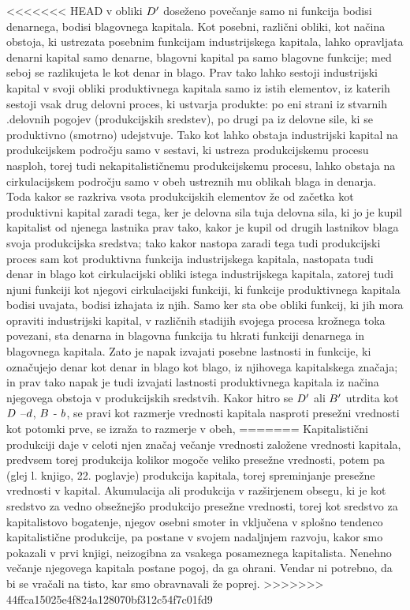 \documentclass[kapital_02.tex]{subfiles}
\begin{document}
<<<<<<< HEAD
 v obliki \( D' \) doseženo povečanje samo ni funkcija bodisi denarnega, bodisi blagovnega kapitala. Kot posebni, različni obliki, kot načina obstoja, ki ustrezata posebnim funkcijam industrijskega kapitala, lahko opravljata denarni kapital samo denarne, blagovni kapital pa samo blagovne funkcije; med seboj se razlikujeta le kot denar in blago. Prav tako lahko sestoji industrijski kapital v svoji obliki produktivnega kapitala samo iz istih elementov, iz katerih sestoji vsak drug delovni proces, ki ustvarja produkte: po eni strani iz stvarnih .delovnih pogojev (produkcijskih sredstev), po drugi pa iz delovne sile, ki se produktivno (smotrno) udejstvuje. Tako kot lahko obstaja industrijski kapital na produkcijskem področju samo v sestavi, ki ustreza produkcijskemu procesu nasploh, torej tudi nekapitalističnemu produkcijskemu procesu, lahko obstaja na cirkulacijskem področju samo v obeh ustreznih mu oblikah blaga in denarja. Toda kakor se razkriva vsota produkcijskih elementov že od začetka kot produktivni kapital zaradi tega, ker je delovna sila tuja delovna sila, ki jo je kupil kapitalist od njenega lastnika prav tako, kakor je kupil od drugih lastnikov blaga svoja produkcijska sredstva; tako kakor nastopa zaradi tega tudi produkcijski proces sam kot produktivna funkcija industrijskega kapitala, nastopata tudi denar in blago kot cirkulacijski obliki istega industrijskega kapitala, zatorej tudi njuni funkciji kot njegovi cirkulacijski funkciji, ki funkcije produktivnega kapitala bodisi uvajata, bodisi izhajata iz njih. Samo ker sta obe obliki funkcij, ki jih mora opraviti industrijski kapital, v različnih stadijih svojega procesa krožnega toka povezani, sta denarna in blagovna funkcija tu hkrati funkciji denarnega in blagovnega kapitala. Zato je napak izvajati posebne lastnosti in funkcije, ki označujejo denar kot denar in blago kot blago, iz njihovega kapitalskega značaja; in prav tako napak je tudi izvajati lastnosti produktivnega kapitala iz načina njegovega obstoja v produkcijskih sredstvih. Kakor hitro se \( D' \) ali \( B' \) utrdita kot \( D \) --\( d \), \( B \) - \( b \), se pravi kot razmerje vrednosti kapitala nasproti presežni vrednosti kot potomki prve, se izraža to razmerje v obeh,
=======
Kapitalistični \KPEstran produkciji daje v celoti njen značaj večanje vrednosti založene vrednosti kapitala, predvsem torej produkcija kolikor mogoče veliko presežne vrednosti, potem pa (glej l. knjigo, 22. poglavje) produkcija kapitala, torej spreminjanje presežne vrednosti v kapital. Akumulacija ali produkcija v razširjenem obsegu, ki je kot sredstvo za vedno obsežnejšo produkcijo presežne vrednosti, torej kot sredstvo za kapitalistovo bogatenje, njegov osebni smoter in vključena v splošno tendenco kapitalistične produkcije, pa postane v svojem nadaljnjem razvoju, kakor smo pokazali v prvi knjigi, neizogibna za vsakega posameznega kapitalista. Nenehno večanje njegovega kapitala postane pogoj, da ga ohrani. Vendar ni potrebno, da bi se vračali na tisto, kar smo obravnavali že poprej.
>>>>>>> 44ffca15025e4f824a128070bf312c54f7c01fd9
\end{document}
